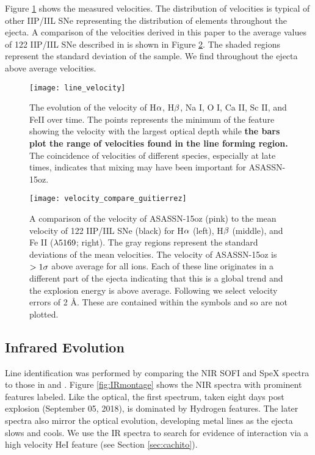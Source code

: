 \documentclass[a4paper,fleqn,usenatbib]{mnras}
\begin{document}
Figure \ref{fig:velocity} shows the measured velocities. 
The distribution of velocities is typical of other IIP/IIL SNe representing the distribution of elements throughout the ejecta. 
A comparison of the velocities derived in this paper to the average values of 122 IIP/IIL SNe described in \citet{2017gutierrez} is shown in Figure \ref{fig:VelocityCompare}. 
The shaded regions represent the standard deviation of the sample.
We find throughout the ejecta above average velocities.
\begin{figure}
\begin{center}
\texttt{[image: line\_velocity]}
\caption{The evolution of the velocity of H$\rm{\alpha}$, H$\rm{\beta}$, Na I, O I, Ca II, Sc II, and FeII over time. 
The points represents the minimum of the feature showing the velocity with the largest optical depth while \textbf{the bars plot the range of velocities found in the line forming region.}
The coincidence of velocities of different species, especially at late times, indicates that mixing may have been important for ASASSN-15oz.}
\label{fig:velocity}
\end{center}
\end{figure}
\begin{figure*}
\begin{center}
\texttt{[image: velocity\_compare\_guitierrez]}
\caption{A comparison of the velocity of ASASSN-15oz (pink) to the mean velocity of 122 IIP/IIL SNe \citep{2017gutierrez} (black) for H$\rm{\alpha}$ (left), H$\rm{\beta}$ (middle), and Fe II ($\rm{\lambda 5169}$; right). 
The gray regions represent the standard deviations of the mean velocities.
The velocity of ASASSN-15oz is $\rm{>1\sigma}$ above average for all ions. 
Each of these line originates in a different part of the ejecta indicating that this is a global trend and the explosion energy is above average. 
Following \citep{2012silverman} we select velocity errors of 2 \AA.
These are contained within the symbols and so are not plotted.}
\label{fig:VelocityCompare}
\end{center}
\end{figure*}
\subsection{Infrared Evolution}
Line identification was performed by comparing the NIR SOFI and SpeX spectra to those in \citet{2015valenti} and \citet{2018tomasella}.
Figure \ref{fig:IRmontage} shows the NIR spectra with prominent features labeled.
Like the optical, the first spectrum, taken eight days post explosion (September 05, 2018), is dominated by Hydrogen features.
The later spectra also mirror the optical evolution, developing metal lines as the ejecta slows and cools.
We use the IR spectra to search for evidence of interaction via a high velocity HeI feature (see Section \ref{sec:cachito}).
\end{document}
